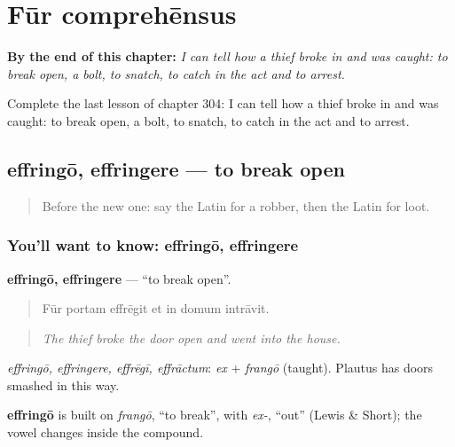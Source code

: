 
\chapter{Fūr comprehēnsus}
\label{ch:la-fur-comprehensus}

\begin{chapteropening}
\textbf{By the end of this chapter:} \emph{I can tell how a thief broke in and was caught: to break open, a bolt, to snatch, to catch in the act and to arrest.}

Complete the last lesson of chapter 304: I can tell how a thief broke in and was caught: to break open, a bolt, to snatch, to catch in the act and to arrest.
\end{chapteropening}

\section[effringō, effringere]{effringō, effringere — to break open}

\label{lesson:LA-C304-effringo}



\begin{quote}
Before the new one: say the Latin for a robber, then the Latin for loot.
\end{quote}

\subsection*{You'll want to know: effringō, effringere}
\textbf{effringō, effringere} — \textquotedblleft{}to break open\textquotedblright{}.

\begin{quote}
Fūr portam effrēgit et in domum intrāvit.
\end{quote}

\begin{quote}
\emph{The thief broke the door open and went into the house.}
\end{quote}

\emph{effringō, effringere, effrēgī, effrāctum}: \emph{ex} + \emph{frangō} (taught). Plautus has doors smashed in this way.

\begin{cousinweb}
\textbf{effringō} is built on \emph{frangō}, \textquotedblleft{}to break\textquotedblright{}, with \emph{ex-}, \textquotedblleft{}out\textquotedblright{} (Lewis \& Short); the vowel changes inside the compound.
\end{cousinweb}

